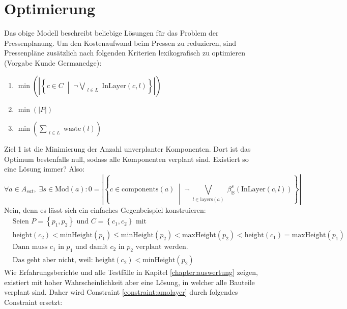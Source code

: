 \section{Optimierung}
\label{sec:optimierung}
Das obige Modell beschreibt beliebige Lösungen für das Problem der Pressenplanung.
Um den Kostenaufwand beim Pressen zu reduzieren, sind Pressenpläne zusätzlich nach folgenden Kriterien lexikografisch zu optimieren (Vorgabe Kunde Germanedge):
\begin{enumerate}
    \item $ \min \left( \left\lvert \left\{ c \in C \; \middle| \; \neg\bigvee\limits_{\substack{l \in L}} \text{InLayer}(c,l) \right\} \right\rvert \right) $
    \item $ \min (\lvert P \rvert) $
    \item $ \min \left(\sum\limits_{\substack{l \in L}} \text{waste}(l) \right) $
\end{enumerate}
Ziel 1 ist die Minimierung der Anzahl unverplanter Komponenten.
Dort ist das Optimum bestenfalls null, sodass alle Komponenten verplant sind.
Existiert so eine Lösung immer?
Also:
\[
    \forall a \in A_{sat}, \; \exists s \in \text{Mod}(a): 0 = \left\lvert \left\{ c \in \text{components}(a) \; \middle| \; \neg\bigvee\limits_{\substack{l \in \text{layers}(a)}} \beta_{\mathbb{B}}^{s}(\text{InLayer}(c,l)) \right\} \right\rvert
\]
Nein, denn es lässt sich ein einfaches Gegenbeispiel konstruieren:
\begin{align*}
    &\hspace{0pt} \text{Seien } P = \left\{ p_1, p_2 \right\} \text{ und } C = \left\{ c_1,c_2 \right\} \text{ mit } \\
    &\hspace{0pt} \text{height}(c_2) < \text{minHeight}(p_1) \leq \text{minHeight}(p_2) < \text{maxHeight}(p_2) < \text{height}(c_1) = \text{maxHeight}(p_1) \\
    &\hspace{0pt} \text{Dann muss } c_1 \text{ in } p_1 \text{ und damit } c_2 \text{ in } p_2 \text{ verplant werden.} \\
    &\hspace{0pt} \text{Das geht aber nicht, weil: } \text{height}(c_2) < \text{minHeight}(p_2)
\end{align*}
Wie Erfahrungsberichte und alle Testfälle in Kapitel \ref{chapter:auswertung} zeigen, existiert mit hoher Wahrscheinlichkeit aber eine Lösung, in welcher alle Bauteile verplant sind.
Daher wird Constraint \ref{constraint:amolayer} durch folgendes Constraint ersetzt:
